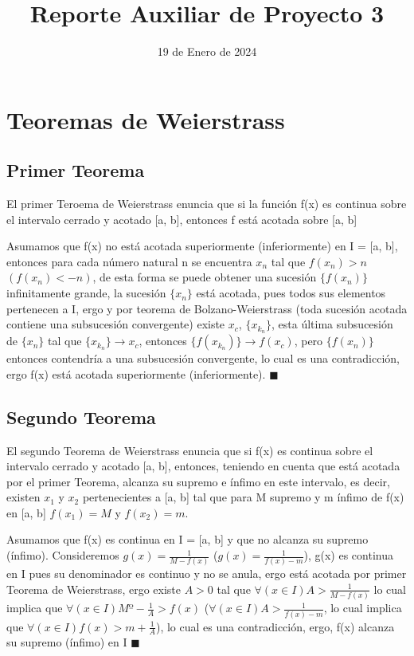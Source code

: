 \documentclass{article}
\begin{document}
\title{Reporte Auxiliar de Proyecto 3}
\date{19 de Enero de 2024}
\maketitle

\section{Teoremas de Weierstrass}

\subsection{Primer Teorema}

El primer Teroema de Weierstrass enuncia que si la función f(x) es continua sobre el intervalo cerrado y acotado [a, b], entonces f está acotada sobre [a, b]

Asumamos que f(x) no está acotada superiormente (inferiormente) en I = [a, b], entonces para cada número natural n se encuentra $x_n$ tal que $f(x_n) > n$ $(f(x_n) < -n)$, de esta forma se puede obtener una sucesión $\{f(x_n)\}$ infinitamente grande, la sucesión $\{x_n\}$ está acotada, pues todos sus elementos pertenecen a I, ergo y por teorema de Bolzano-Weierstrass (toda sucesión acotada contiene una subsucesión convergente) existe $x_c$, $\{x_{k_n}\}$, esta última subsucesión de $\{x_n\}$ tal que $\{x_{k_n}\} \rightarrow x_c$, entonces $\{f(x_{k_n})\} \rightarrow f(x_c)$, pero $\{f(x_n)\}$ entonces contendría a una subsucesión convergente, lo cual es una contradicción, ergo f(x) está acotada superiormente (inferiormente). $\blacksquare$

\subsection{Segundo Teorema}

El segundo Teorema de Weierstrass enuncia que si f(x) es continua sobre el intervalo cerrado y acotado [a, b], entonces, teniendo en cuenta que está acotada por el primer Teorema, alcanza su supremo e ínfimo en este intervalo, es decir, existen $x_1$ y $x_2$ pertenecientes a [a, b] tal que para M supremo y m ínfimo de f(x) en [a, b] $f(x_1) = M$ y $f(x_2) = m$.

Asumamos que f(x) es continua en I = [a, b] y que no alcanza su supremo (ínfimo). Consideremos $g(x) = \frac{1}{M - f(x)}$ ($g(x) = \frac{1}{f(x) - m}$), g(x) es continua en I pues su denominador es continuo y no se anula, ergo está acotada por primer Teorema de Weierstrass, ergo existe $A > 0$ tal que $\forall(x \in I) A > \frac{1}{M - f(x)}$ lo cual implica que $\forall(x \in I) Mº - \frac{1}{A} > f(x)$ ($\forall(x \in I) A > \frac{1}{f(x) - m}$, lo cual implica que $\forall(x \in I) f(x) > m + \frac{1}{A}$), lo cual es una contradicción, ergo, f(x) alcanza su supremo (ínfimo) en I $\blacksquare$
\end{document}
